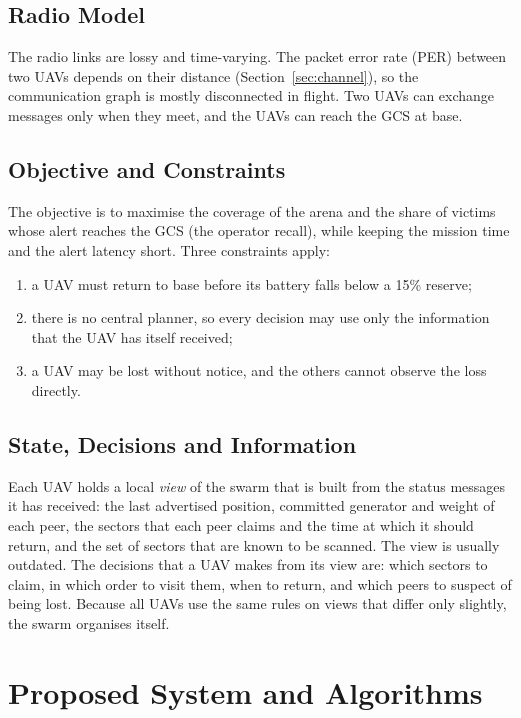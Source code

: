 \documentclass[10pt,letterpaper]{article}
\begin{document}
\subsection{Radio Model}
The radio links are lossy and time-varying. The packet error rate (PER) between two UAVs depends on their distance (Section~\ref{sec:channel}), so the communication graph is mostly disconnected in flight. Two UAVs can exchange messages only when they meet, and the UAVs can reach the GCS at base.

\subsection{Objective and Constraints}
The objective is to maximise the coverage of the arena and the share of victims whose alert reaches the GCS (the operator recall), while keeping the mission time and the alert latency short. Three constraints apply:
\begin{enumerate}
\item a UAV must return to base before its battery falls below a 15\% reserve;
\item there is no central planner, so every decision may use only the information that the UAV has itself received;
\item a UAV may be lost without notice, and the others cannot observe the loss directly.
\end{enumerate}

\subsection{State, Decisions and Information}
Each UAV holds a local \emph{view} of the swarm that is built from the status messages it has received: the last advertised position, committed generator and weight of each peer, the sectors that each peer claims and the time at which it should return, and the set of sectors that are known to be scanned. The view is usually outdated. The decisions that a UAV makes from its view are: which sectors to claim, in which order to visit them, when to return, and which peers to suspect of being lost. Because all UAVs use the same rules on views that differ only slightly, the swarm organises itself.

\section{Proposed System and Algorithms}\label{sec:design}
\end{document}
